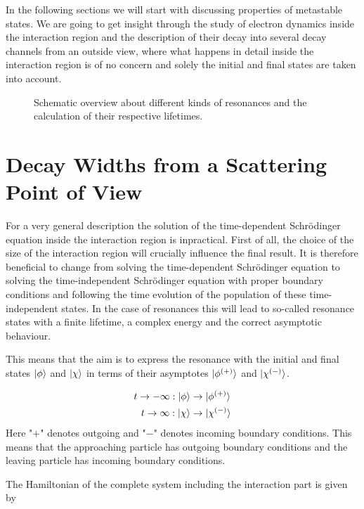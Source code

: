 In the following sections we will start with 
discussing properties of metastable states.
We are going to get insight through the study of electron dynamics inside
the interaction region
and the description of their decay into several decay channels from an outside
view, where what happens in detail inside the interaction region is of no
concern and solely the initial and final states are taken into
account. \cite{Gell-Mann53}


\begin{figure}[h]
  \centering
  
  \caption{Schematic overview about different kinds of resonances and the
           calculation of their respective lifetimes.}
  \label{figure:overview_resonances}
\end{figure}





\section{Decay Widths from a Scattering Point of View}
For a very general description the solution of the time-dependent Schrödinger
equation inside the interaction region is inpractical. First of all, the
choice of the size of the interaction region will crucially influence the
final result. It is therefore beneficial to change from solving the time-dependent
Schrödinger equation to solving the time-independent Schrödinger equation
with proper boundary conditions and following the time evolution of the population
of these time-independent states. In the case of resonances
this will lead to so-called resonance states
with a finite lifetime, a complex energy and the correct asymptotic behaviour.

This means that the aim is to express the resonance with the initial and final
states $\ket{\phi}$ and $\ket{\chi}$ in terms of their asymptotes
$\ket{\phi ^{(+)}}$ and $\ket{\chi ^{(-)}}$.

\begin{align}
  t \rightarrow -\infty:  \ket{\phi}  &\rightarrow \ket{\phi ^{(+)}}\\
  t \rightarrow \infty :  \ket{\chi}  &\rightarrow \ket{\chi ^{(-)}}
\end{align}
Here "$+$" denotes outgoing and "$-$" denotes incoming boundary conditions.
This means that the approaching particle has outgoing boundary conditions and the
leaving particle has incoming boundary conditions.

The Hamiltonian of the complete system including the interaction part
is given by

